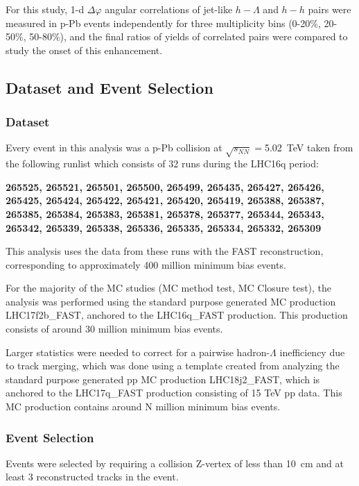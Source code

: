 \documentclass[ALICE,manyauthors]{ALICE_analysis_notes}
\begin{document}
For this study, 1-d $\Delta\varphi$ angular correlations of jet-like $h-\Lambda$ and $h-h$ pairs were measured in p-Pb events independently for three multiplicity bins (0-20\%, 20-50\%, 50-80\%), and the final ratios of yields of correlated pairs were compared to study the onset of this enhancement. 


\subsection{Dataset and Event Selection}

\subsubsection{Dataset}

Every event in this analysis was a p-Pb collision at $\sqrt{s_{NN}} =$\SI{5.02}{TeV} taken from the following runlist which consists of 32 runs during the LHC16q period:

\textbf{265525, 265521, 265501, 265500, 265499, 265435, 265427, 265426, 265425, 265424, 265422, 265421, 265420, 265419, 265388, 265387, 265385, 265384, 265383, 265381, 265378, 265377, 265344, 265343, 265342, 265339, 265338, 265336, 265335, 265334, 265332, 265309}


This analysis uses the data from these runs with the FAST reconstruction, corresponding to approximately 400 million minimum bias events.

For the majority of the MC studies (MC method test, MC Closure test), the analysis was performed using the standard purpose generated MC production LHC17f2b\_FAST, anchored to the LHC16q\_FAST production. This production consists of around 30 million minimum bias events.

Larger statistics were needed to correct for a pairwise hadron-$\Lambda$ inefficiency due to track merging, which was done using a template created from analyzing the standard purpose generated pp MC production LHC18j2\_FAST, which is anchored to the LHC17q\_FAST production consisting of 15 TeV pp data. 
This MC production contains around N million minimum bias events.

\subsubsection{Event Selection}

Events were selected by requiring a collision Z-vertex of less than \SI{10}{cm} and at least 3 reconstructed tracks in the event.  
\end{document}

